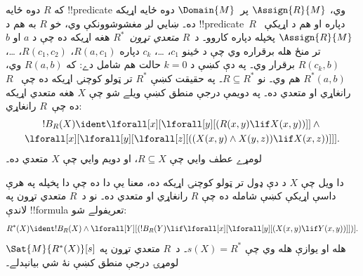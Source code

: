 \documentclass[../../../include/open-logic-section]{subfiles}
\begin{document}
\begin{ex}
که $R$ دوه ځايه !!{predicate} وي، $\Assign{R}{M}$ پر~$\Domain{M}$
دوه ځايه اړيکه ده۔ ښايي لږ مغشوشوونکې وي، خو $R$ به هم د
!!{predicate}~$R$ دپاره او هم د اړيکې~$\Assign{R}{M}$ پخپله دپاره
کاروو۔ د~$R$
\emph{متعدي تړون}~$R^*$ هغه اړيکه ده چې د $a$ او $b$ تر منځ هله
برقراره وي چې د ځينو $c_1$، \dots، $c_k$ دپاره $R(a,c_1)$،
$R(c_1, c_2)$، \dots، $R(c_k,b)$ برقرار وي۔ په دې کښې د $k = 0$
حالت هم شامل دے: که $R(a,b)$ وي، $R^*(a,b)$ هم وي۔ نو
$R \subseteq R^*$۔ په حقيقت کښې $R^*$ تر ټولو کوچنۍ اړيکه ده چې
~$R$ رانغاړي او متعدي ده۔ په دويمې درجې منطق کښې ويلے شو چې $X$
هغه متعدي اړيکه ده چې~$R$ رانغاړي:
\begin{multline*}
  !B_R(X) \ident \lforall[x][\lforall[y][(R(x,y) \lif X(x, y))]] \land {}\\
\lforall[x][\lforall[y][\lforall[z][((X(x,y) \land X(y,z)) \lif X(x,
      z))]]].
\end{multline*}
لومړے عطف وايي چې $R \subseteq X$، او دويم وايي چې $X$ متعدي ده۔

دا ويل چې $X$ د دې ډول تر ټولو کوچنۍ اړيکه ده، معنا يې دا ده چې
دا پخپله په هرې داسې اړيکې کښې شامله ده چې $R$ رانغاړي او متعدي ده۔
نو د~$R$ متعدي تړون په لاندې !!{formula} تعريفولے شو:
\[
R^*(X) \ident !B_R(X) \land \lforall[Y][(!B_R(Y) \lif
  \lforall[x][\lforall[y][(X(x, y) \lif Y(x,y))]])].
\]
$\Sat{M}{R^*(X)}[s]$ هله او يوازې هله وي چې $s(X) = R^*$۔ د~$R$
متعدي تړون په لومړۍ درجې منطق کښې نۀ شي بيانېدلے۔
\end{ex}
\end{document}
